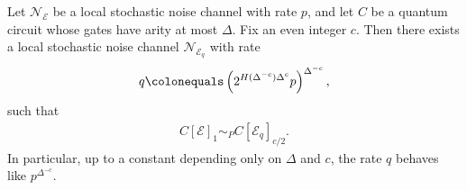 \begin{claim}
  \label{claim:block_noise_renorm}
  Let $\mathcal{N}_{\mathcal{E}}$ be a local stochastic noise channel with rate $p$, and let $C$ be a quantum circuit whose gates have arity at most $\Delta$. Fix an even integer $c$. Then there exists a local stochastic noise channel $\mathcal{N}_{\mathcal{E}_{q}}$ with rate
  \begin{equation*}
    \begin{split}
      q \colonequals \left(2^{H(\Delta^{-c})\Delta^{c}}p\right)^{\Delta^{-c}},
    \end{split}
  \end{equation*}
  such that
  \begin{equation*}
    \begin{split}
      C[\mathcal{E}]_{1} \sim_{P} C[\mathcal{E}_{q}]_{c/2}.
    \end{split}
  \end{equation*}
  In particular, up to a constant depending only on $\Delta$ and $c$, the rate $q$ behaves like $p^{\Delta^{-c}}$.
\end{claim}
